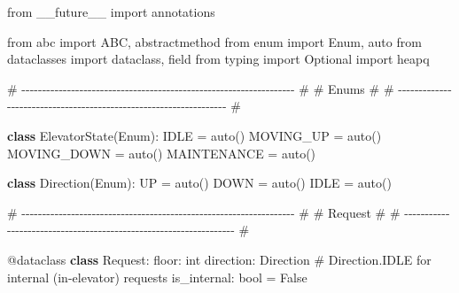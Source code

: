 \documentclass[11pt]{article}
\newenvironment{Shaded}{\begin{snugshade}}{\end{snugshade}}
\newcommand{\AttributeTok}[1]{\textcolor[rgb]{0.16,0.50,0.73}{#1}}
\newcommand{\BuiltInTok}[1]{\textcolor[rgb]{0.50,0.55,0.55}{#1}}
\newcommand{\CommentTok}[1]{\textcolor[rgb]{0.48,0.49,0.49}{#1}}
\newcommand{\ImportTok}[1]{\textcolor[rgb]{0.15,0.68,0.38}{#1}}
\newcommand{\KeywordTok}[1]{\textcolor[rgb]{0.81,0.81,0.76}{\textbf{#1}}}
\newcommand{\NormalTok}[1]{\textcolor[rgb]{0.81,0.81,0.76}{#1}}
\newcommand{\OperatorTok}[1]{\textcolor[rgb]{0.81,0.81,0.76}{#1}}
\newcommand{\VariableTok}[1]{\textcolor[rgb]{0.15,0.68,0.68}{#1}}
\begin{document}
\begin{Shaded}
\begin{Highlighting}[]
\ImportTok{from}\NormalTok{ \_\_future\_\_ }\ImportTok{import}\NormalTok{ annotations}

\ImportTok{from}\NormalTok{ abc }\ImportTok{import}\NormalTok{ ABC, abstractmethod}
\ImportTok{from}\NormalTok{ enum }\ImportTok{import}\NormalTok{ Enum, auto}
\ImportTok{from}\NormalTok{ dataclasses }\ImportTok{import}\NormalTok{ dataclass, field}
\ImportTok{from}\NormalTok{ typing }\ImportTok{import}\NormalTok{ Optional}
\ImportTok{import}\NormalTok{ heapq}


\CommentTok{\# {-}{-}{-}{-}{-}{-}{-}{-}{-}{-}{-}{-}{-}{-}{-}{-}{-}{-}{-}{-}{-}{-}{-}{-}{-}{-}{-}{-}{-}{-}{-}{-}{-}{-}{-}{-}{-}{-}{-}{-}{-}{-}{-}{-}{-}{-}{-}{-}{-}{-}{-}{-}{-}{-}{-}{-}{-}{-}{-}{-}{-}{-}{-}{-}{-}{-} \#}
\CommentTok{\# Enums                                                               \#}
\CommentTok{\# {-}{-}{-}{-}{-}{-}{-}{-}{-}{-}{-}{-}{-}{-}{-}{-}{-}{-}{-}{-}{-}{-}{-}{-}{-}{-}{-}{-}{-}{-}{-}{-}{-}{-}{-}{-}{-}{-}{-}{-}{-}{-}{-}{-}{-}{-}{-}{-}{-}{-}{-}{-}{-}{-}{-}{-}{-}{-}{-}{-}{-}{-}{-}{-}{-}{-} \#}

\KeywordTok{class}\NormalTok{ ElevatorState(Enum):}
\NormalTok{    IDLE }\OperatorTok{=}\NormalTok{ auto()}
\NormalTok{    MOVING\_UP }\OperatorTok{=}\NormalTok{ auto()}
\NormalTok{    MOVING\_DOWN }\OperatorTok{=}\NormalTok{ auto()}
\NormalTok{    MAINTENANCE }\OperatorTok{=}\NormalTok{ auto()}


\KeywordTok{class}\NormalTok{ Direction(Enum):}
\NormalTok{    UP }\OperatorTok{=}\NormalTok{ auto()}
\NormalTok{    DOWN }\OperatorTok{=}\NormalTok{ auto()}
\NormalTok{    IDLE }\OperatorTok{=}\NormalTok{ auto()}


\CommentTok{\# {-}{-}{-}{-}{-}{-}{-}{-}{-}{-}{-}{-}{-}{-}{-}{-}{-}{-}{-}{-}{-}{-}{-}{-}{-}{-}{-}{-}{-}{-}{-}{-}{-}{-}{-}{-}{-}{-}{-}{-}{-}{-}{-}{-}{-}{-}{-}{-}{-}{-}{-}{-}{-}{-}{-}{-}{-}{-}{-}{-}{-}{-}{-}{-}{-}{-} \#}
\CommentTok{\# Request                                                             \#}
\CommentTok{\# {-}{-}{-}{-}{-}{-}{-}{-}{-}{-}{-}{-}{-}{-}{-}{-}{-}{-}{-}{-}{-}{-}{-}{-}{-}{-}{-}{-}{-}{-}{-}{-}{-}{-}{-}{-}{-}{-}{-}{-}{-}{-}{-}{-}{-}{-}{-}{-}{-}{-}{-}{-}{-}{-}{-}{-}{-}{-}{-}{-}{-}{-}{-}{-}{-}{-} \#}

\AttributeTok{@dataclass}
\KeywordTok{class}\NormalTok{ Request:}
\NormalTok{    floor: }\BuiltInTok{int}
\NormalTok{    direction: Direction  }\CommentTok{\# Direction.IDLE for internal (in{-}elevator) requests}
\NormalTok{    is\_internal: }\BuiltInTok{bool} \OperatorTok{=} \VariableTok{False}


\end{Highlighting}
\end{Shaded}
\end{document}
